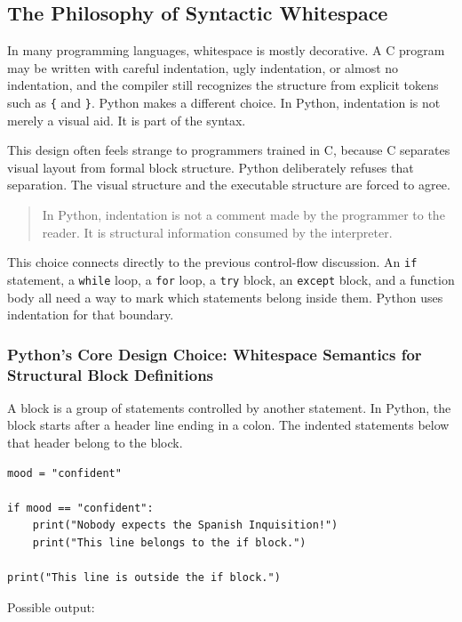 \documentclass[a4paper,twoside]{report}
\begin{document}
\subsection{The Philosophy of Syntactic Whitespace}

In many programming languages, whitespace is mostly decorative. A C program may be written with careful indentation, ugly indentation, or almost no indentation, and the compiler still recognizes the structure from explicit tokens such as \texttt{\{} and \texttt{\}}. Python makes a different choice. In Python, indentation is not merely a visual aid. It is part of the syntax.

This design often feels strange to programmers trained in C, because C separates visual layout from formal block structure. Python deliberately refuses that separation. The visual structure and the executable structure are forced to agree.

\begin{quote}
In Python, indentation is not a comment made by the programmer to the reader. It is structural information consumed by the interpreter.
\end{quote}

This choice connects directly to the previous control-flow discussion. An \texttt{if} statement, a \texttt{while} loop, a \texttt{for} loop, a \texttt{try} block, an \texttt{except} block, and a function body all need a way to mark which statements belong inside them. Python uses indentation for that boundary.

\subsubsection{Python’s Core Design Choice: Whitespace Semantics for Structural Block Definitions}

A block is a group of statements controlled by another statement. In Python, the block starts after a header line ending in a colon. The indented statements below that header belong to the block.

\begin{verbatim}
mood = "confident"

if mood == "confident":
    print("Nobody expects the Spanish Inquisition!")
    print("This line belongs to the if block.")

print("This line is outside the if block.")
\end{verbatim}

Possible output:
\end{document}

